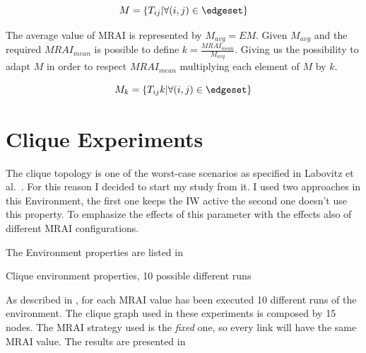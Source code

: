 \[M=\{T_{ij} | \forall (i,j) \in \edgeset\}\]

The average value of \ac{MRAI} is represented by \(M_{avg}=E{M}\).
Given \(M_{avg}\) and the required \(MRAI_{mean}\) is possible to define
\(k=\frac{MRAI_{mean}}{M_{avg}}\).
Giving us the possibility to adapt \(M\) in order to respect \(MRAI_{mean}\)
multiplying each element of \(M\) by \(k\).

\[M_k=\{T_{ij}k | \forall (i,j) \in \edgeset\}\]

\section{Clique Experiments}
\label{sec:bgp_mrai_clique}

The clique topology is one of the worst-case scenarios as specified in Labovitz et al.~\cite{labovitz2000delayed}.
For this reason I decided to start my study from it.
I used two approaches in this Environment, the first one keeps the \ac{IW} active
the second one doesn't use this property.
To emphasize the effects of this parameter with the effects also of different
\ac{MRAI} configurations.

The Environment properties are listed in 

\begin{table}[h]
	
		\caption{Clique environment properties, \num{10} possible different runs}
    \label{tbl:clique_properties}
\end{table}

As described in , for each \ac{MRAI} value has been
executed \num{10} different runs of the environment.
The clique graph used in these experiments is composed by \num{15} nodes.
The \ac{MRAI} strategy used is the \textit{fixed} one, so every link will have the
same \ac{MRAI} value.
The results are presented in 


